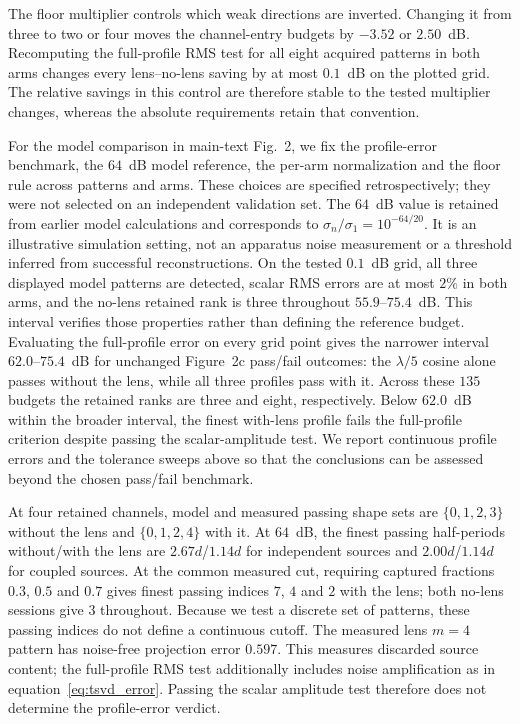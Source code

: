 \documentclass[pdflatex,sn-nature]{sn-jnl}%
\begin{document}
The floor multiplier controls which weak directions are inverted. Changing it from three to two or four moves the channel-entry budgets by $-3.52$ or $2.50$~dB. Recomputing the full-profile RMS test for all eight acquired patterns in both arms changes every lens--no-lens saving by at most $0.1$~dB on the plotted grid. The relative savings in this control are therefore stable to the tested multiplier changes, whereas the absolute requirements retain that convention.

For the model comparison in main-text Fig.~2, we fix the profile-error benchmark, the $64$~dB model reference, the per-arm normalization and the floor rule across patterns and arms. These choices are specified retrospectively; they were not selected on an independent validation set. The $64$~dB value is retained from earlier model calculations and corresponds to $\sigma_n/\sigma_1=10^{-64/20}$. It is an illustrative simulation setting, not an apparatus noise measurement or a threshold inferred from successful reconstructions. On the tested $0.1$~dB grid, all three displayed model patterns are detected, scalar RMS errors are at most $2\%$ in both arms, and the no-lens retained rank is three throughout $55.9$--$75.4$~dB. This interval verifies those properties rather than defining the reference budget. Evaluating the full-profile error on every grid point gives the narrower interval $62.0$--$75.4$~dB for unchanged Figure~2c pass/fail outcomes: the $\lambda/5$ cosine alone passes without the lens, while all three profiles pass with it. Across these $135$ budgets the retained ranks are three and eight, respectively. Below $62.0$~dB within the broader interval, the finest with-lens profile fails the full-profile criterion despite passing the scalar-amplitude test. We report continuous profile errors and the tolerance sweeps above so that the conclusions can be assessed beyond the chosen pass/fail benchmark.


At four retained channels, model and measured passing shape sets are
$\{0,1,2,3\}$ without the lens and $\{0,1,2,4\}$ with it.
At $64$~dB, the finest passing half-periods without/with the lens are
$2.67d$/$1.14d$ for independent sources and $2.00d$/$1.14d$ for coupled sources.
At the common measured cut, requiring captured fractions $0.3$, $0.5$
and $0.7$ gives finest passing indices $7$, $4$ and $2$ with the lens;
both no-lens sessions give $3$ throughout. Because we test a discrete set of patterns, these passing indices do not define a continuous cutoff. The measured lens $m=4$ pattern has noise-free projection error $0.597$. This measures discarded source content; the full-profile RMS test additionally includes noise amplification as in equation~\eqref{eq:tsvd_error}. Passing the scalar amplitude test therefore does not determine the profile-error verdict.
\end{document}
